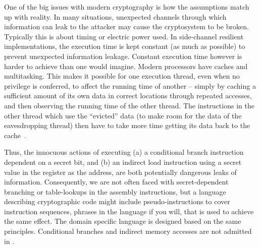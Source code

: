 
One of the big issues with modern cryptography is how the assumptions
match up with reality. In many situations, unexpected channels
through which information can leak to the attacker may cause the
cryptosystem to be broken. Typically this is about timing or
electric power used.
In side-channel resilient implementations, the execution time
is kept constant (as much as possible) to prevent unexpected
information leakage.
Constant execution time however is harder to achieve than one would imagine.
Modern processors have caches
and multitasking. This makes it possible for one execution
thread, even when no privilege is conferred, to affect the running
time of another -- simply by caching a sufficient amount of its own
data in correct locations through repeated accesses, and then
observing the running time of the other thread. The instructions in
the other thread which use the ``evicted'' data (to make room for the
data of the eavesdropping thread) then have to take more time getting
its data back to the cache~\cite{B:05:CTAA}.



Thus, the innocuous actions of executing (a) a conditional
branch instruction dependent on a secret bit, and (b) an
indirect load instruction using a secret value in the register as the
address, are both potentially dangerous leaks of information.
Consequently, we are not often
faced with secret-dependent branching or table-lookups in the assembly
instructions, but a language describing cryptographic code might
include pseudo-instructions to cover instruction sequences, phrases in
the language if you will, that is used to achieve the same effect.
The domain specific language \bvdsl is designed based on the same
principles. Conditional branches and indirect memory accesses are not
admitted in \bvdsl.

